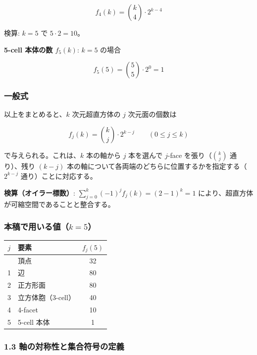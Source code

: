 \documentclass[
  a4paper,11pt]{ltjsarticle}
\newcounter{none}
\theoremstyle{definition}
\theoremstyle{remark}
\begin{document}
\[f_4(k) = \binom{k}{4} \cdot 2^{k-4}\]

検算: \(k=5\) で \(5 \cdot 2 = 10\)。

\textbf{5-cell 本体の数 \(f_5(k)\)}: \(k=5\) の場合

\[f_5(5) = \binom{5}{5} \cdot 2^0 = 1\]

\subsubsection{一般式}\label{ux4e00ux822cux5f0f}

以上をまとめると、\(k\) 次元超直方体の \(j\) 次元面の個数は

\[f_j(k) = \binom{k}{j} \cdot 2^{k-j} \qquad (0 \leq j \leq k)\]

で与えられる。これは、\(k\) 本の軸から \(j\) 本を選んで \(j\)-face
を張り（\(\binom{k}{j}\) 通り）、残り \((k-j)\)
本の軸について各両端のどちらに位置するかを指定する（\(2^{k-j}\)
通り）ことに対応する。

\textbf{検算（オイラー標数）}:
\(\sum_{j=0}^{k} (-1)^j f_j(k) = (2-1)^k = 1\)
により、超直方体が可縮空間であることと整合する。

\subsubsection{\texorpdfstring{本稿で用いる値（\(k=5\)）}{本稿で用いる値（k=5）}}\label{ux672cux7a3fux3067ux7528ux3044ux308bux5024k5}

{\def\LTcaptype{none} %
\begin{longtable}[]{@{}clc@{}}
\toprule\noalign{}
\(j\) & 要素 & \(f_j(5)\) \\
\midrule\noalign{}
\endhead
\bottomrule\noalign{}
\endlastfoot
0 & 頂点 & 32 \\
1 & 辺 & 80 \\
2 & 正方形面 & 80 \\
3 & 立方体胞（3-cell） & 40 \\
4 & 4-facet & 10 \\
5 & 5-cell 本体 & 1 \\
\end{longtable}
}

\subsubsection{1.3
軸の対称性と集合符号の定義}\label{ux8ef8ux306eux5bfeux79f0ux6027ux3068ux96c6ux5408ux7b26ux53f7ux306eux5b9aux7fa9}
\end{document}
